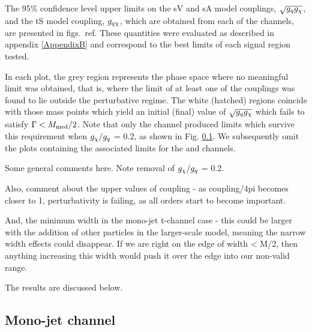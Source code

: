 The 95\% confidence level upper limits on the sV and sA model couplings, $\sqrt{g_q g_{\chi}}$, and the tS model coupling, $g_{q \chi}$, which are obtained from each of the \monoX channels, are presented in figs.~ref{}. These quantities were evaluated as described in appendix \ref{AppendixB} and correspond to the best limits of each signal region tested.

In each plot, the grey region represents the phase space where no meaningful limit was obtained, that is, where the limit of at least one of the couplings was found to lie outside the perturbative regime. The white (hatched) regions coincide with those mass points which yield an initial (final) value of $\sqrt{g_q g_{\chi}}$ which fails to satisfy $\Gamma < M_{\mathrm{med}} / 2$. Note that only the \monojet channel produced limits which survive this requirement when $g_{\chi} / g_q$ = 0.2, as shown in Fig. \ref{}. We subsequently omit the plots containing the associated limits for the \monoZ and \monoWZ channels.

Some general comments here. Note removal of $g_{\chi} / g_q$ = 0.2.

Also, comment about the upper values of coupling - as coupling/4pi becomes closer to 1, perturbativity is failing, as all orders start to become important.

And, the minimum width in the mono-jet t-channel case - this could be larger with the addition of other particles in the larger-scale model, meaning the narrow width effects could disappear. If we are right on the edge of width < M/2, then anything increasing this width would push it over the edge into our non-valid range.

The results are discussed below.

\subsection{Mono-jet channel}

